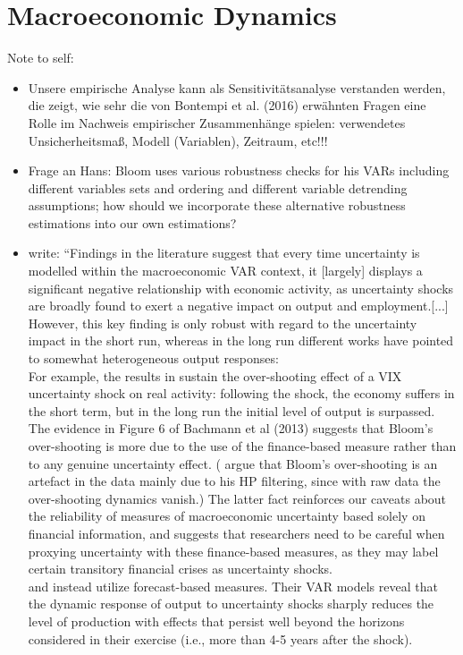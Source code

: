 \documentclass[a4paper,11pt,listof=nochaptergap,oneside,pointednumbers,bibtotoc,bigheadings,liststotoc]{scrbook}
\theoremstyle{mysatz}
\theoremstyle{mydefinition}
\theoremstyle{mybemerkung}
\begin{document}
\chapter{Macroeconomic Dynamics}
\label{sec:EmpiricalAnalysis}
\begingroup
    \fontsize{8pt}{12pt}\selectfont
    Note to self:
\begin{itemize}
	\item Unsere empirische Analyse kann als Sensitivitätsanalyse verstanden werden, die zeigt, wie sehr die von Bontempi et al. (2016) erwähnten Fragen eine Rolle im Nachweis empirischer Zusammenhänge spielen: verwendetes Unsicherheitsmaß, Modell (Variablen), Zeitraum, etc!!!
	\item Frage an Hans: Bloom uses various robustness checks for his VARs including different variables sets and ordering and different variable detrending assumptions; how should we incorporate these alternative robustness estimations into our own estimations?
	\item \citet{bontempietal:16} write: ``Findings in the literature suggest that every time uncertainty is modelled within the macroeconomic VAR context, it [largely] displays a significant negative relationship with economic activity, as uncertainty shocks are broadly found to exert a negative impact on output and employment.[...] \\
	However, this key finding is only robust with regard to the uncertainty impact in the short run, whereas in the long run different works have pointed to somewhat heterogeneous output responses:\\
	For example, the results in \citet{bloom:09} sustain the over-shooting effect of a VIX uncertainty shock on real activity: following the shock, the economy suffers in the short term, but in the long run the initial level of output is surpassed. The evidence in Figure 6 of Bachmann et al (2013) suggests that Bloom's over-shooting is more due to the use of the finance-based measure rather than to any genuine uncertainty effect. (\citet{juradoetal:15} argue that Bloom's over-shooting is an artefact in the data mainly due to his HP filtering, since with raw data the over-shooting dynamics vanish.) The latter fact reinforces our caveats about the reliability of measures of macroeconomic uncertainty based solely on financial information, and suggests that researchers need to be careful when proxying uncertainty with these finance-based measures, as they may label certain transitory financial crises as uncertainty shocks.\\
	\citet{juradoetal:15} and \citet{bachmannetal:13} instead utilize forecast-based measures. Their VAR models reveal that the dynamic response of output to uncertainty shocks sharply reduces the level of production with effects that persist well beyond the horizons considered in their exercise (i.e., more than 4-5 years after the shock).\\

\end{itemize}
\end{document}

